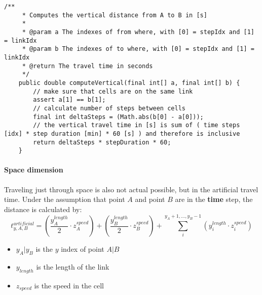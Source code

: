 \begin{lstlisting}[basicstyle=\tiny, style=java, caption={vertical distance calculation}, label=lst:distance_calc_vertical] 
    /**
     * Computes the vertical distance from A to B in [s]
     *
     * @param a The indexes of from where, with [0] = stepIdx and [1] = linkIdx
     * @param b The indexes of to where, with [0] = stepIdx and [1] = linkIdx
     * @return The travel time in seconds
     */
    public double computeVertical(final int[] a, final int[] b) {
        // make sure that cells are on the same link
        assert a[1] == b[1];
        // calculate number of steps between cells
        final int deltaSteps = (Math.abs(b[0] - a[0]));
        // the vertical travel time in [s] is sum of ( time steps [idx] * step duration [min] * 60 [s] ) and therefore is inclusive
        return deltaSteps * stepDuration * 60;
    }
\end{lstlisting}

\paragraph{Space dimension} Traveling just through space is also not actual possible, but in the artificial travel time. Under the assumption that point $A$ and point $B$ are in the \textbf{time} step, the distance is calculated by:  
\begin{equation}
	t_{y,A,B}^{artificial} = (\frac{y_{A}^{length}}{2}  \cdot z_{A}^{speed}) + (\frac{y_{B}^{length}}{2} \cdot z_{B}^{speed}) + \sum_{i}^{y_A + 1,...,y_B - 1} (y_{i}^{length} \cdot z_{i}^{speed})
\end{equation}
\begin{itemize}
	\setlength\itemsep{0.1em}	
	\item[] $y_A | y_B$ is the $y$ index of point $A | B$
	\item[] $y_{length}$ is the length of the link
	\item[] $z_{speed}$ is the speed in the cell
\end{itemize}

